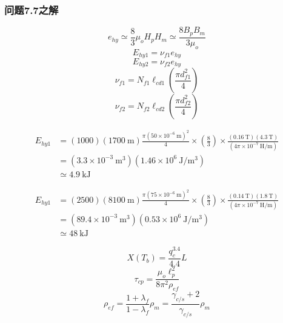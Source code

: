 \subsubsection{问题7.7之解}
\begin{equation}%
e_{hy}\simeq\frac{8}{3}\mu_oH_pH_m 
\simeq\frac{8B_pB_m}{3\mu_o}
\end{equation}
\begin{equation}%
E_{hy1}=\nu_{f1}e_{hy}
\end{equation}
\begin{equation}%
E_{hy2}=\nu_{f2}e_{hy}
\end{equation}
\begin{equation}%
\nu_{f1}=N_{f1}\ell_{cd1}\left(\frac{\pi d_{f1}^{2}}{4}\right)
\end{equation}
\begin{equation}%
\nu_{f2}=N_{f2}\ell_{cd2}\left(\frac{\pi d_{f2}^{2}}{4}\right)
\end{equation}



\begin{align*}%
E_{hy1}&=(1000)(1700\ \mathrm{m})\frac{\pi(50\times 10^{-6}\ \mathrm{m})^2}{4} 
\times\left(\frac{8}{3}\right)\times\frac{(0.16\ \mathrm{T})(4.3\ \mathrm{T})}{(4\pi\times 10^{-7}\ \mathrm{H/m})} \\
&=(3.3\times 10^{-3}\ \mathrm{m^3})(1.46\times 10^6\ \mathrm{J/m^3})\\
&\simeq 4.9\ \mathrm{kJ}
\end{align*}


\begin{align*}%
E_{hy1}&=(2500)(8100\ \mathrm{m})\frac{\pi(75\times 10^{-6}\ \mathrm{m})^2}{4} 
\times\left(\frac{8}{3}\right)\times\frac{(0.14\ \mathrm{T})(1.8\ \mathrm{T})}{(4\pi\times 10^{-7}\ \mathrm{H/m})} \\
&=(89.4\times 10^{-3}\ \mathrm{m^3})(0.53\times 10^6\ \mathrm{J/m^3})\\
&\simeq 48\ \mathrm{kJ}
\end{align*}


\begin{equation}%
X(T_b)=\frac{q_{c}^{3.4}}{4.4}L
\end{equation}
\begin{equation}%
\tau_{cp}=\frac{\mu_o\ell_{p}^{2}}{8\pi^2\rho_{ef}}
\end{equation}
\begin{equation}%
\rho_{ef}=\frac{1+\lambda_f}{1-\lambda_f}\rho_{m} 
=\frac{\gamma_{c/s}+2}{\gamma_{c/s}}\rho_{m}
\end{equation}

